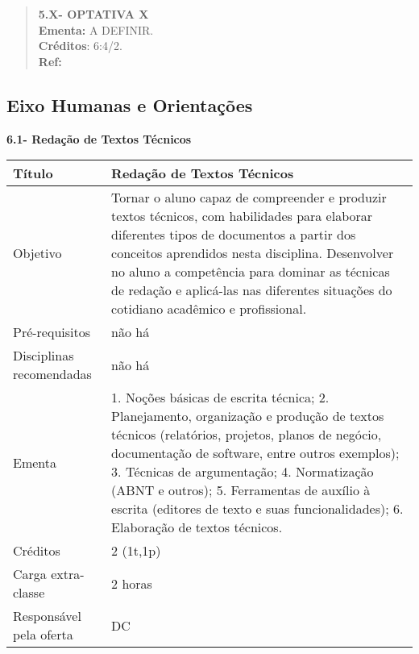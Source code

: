 \begin{quote}
\textbf{5.X- OPTATIVA X }
\\  
\textbf{Ementa:} A DEFINIR.
\\
\textbf{Créditos}: 6:4/2.
\\
\textbf{Ref:}
\end{quote}




\subsection{Eixo Humanas e Orientações}


\textbf{6.1- Redação de Textos Técnicos }
\begin{center}
\begin{tabular}{|p{4.5cm}|p{10.0cm}|} \hline
Título & Redação de Textos Técnicos \\ \hline

Objetivo & Tornar o aluno capaz de compreender e produzir textos técnicos, com habilidades para elaborar diferentes tipos de documentos a partir dos conceitos aprendidos nesta disciplina. Desenvolver no aluno a competência para dominar as técnicas de redação e aplicá-las nas diferentes situações do cotidiano acadêmico e profissional.\\ \hline
Pré-requisitos & não há \\ \hline
Disciplinas recomendadas & não há \\ \hline


Ementa & 1. Noções básicas de escrita técnica; 2. Planejamento, organização e produção de textos técnicos (relatórios, projetos, planos de negócio, documentação de software, entre outros exemplos); 3. Técnicas de argumentação; 4. Normatização (ABNT e outros); 5. Ferramentas de auxílio à escrita (editores de texto e suas funcionalidades); 6. Elaboração de textos técnicos.  
\\ \hline
Créditos & 2 (1t,1p) \\ \hline
Carga extra-classe & 2 horas \\ \hline
Responsável pela oferta & DC \\ \hline
\end{tabular}
\end{center}



